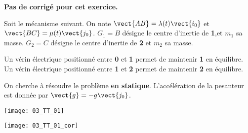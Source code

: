 \normaltrue
\correctiontrue



\setcounter{numques}{0}
\ifcorrection
\else
\textbf{Pas de corrigé pour cet exercice.}
\fi

\ifprof
\else
Soit le mécanisme suivant. On note $\vect{AB}=\lambda(t)\vect{i_0}$ et $\vect{BC}=\mu(t)\vect{j_0}$.
$G_1 = B$ désigne le centre d'inertie de \textbf{1},et $m_1$ sa masse. %
$G_2 = C$ désigne le centre d'inertie de \textbf{2} et  $m_2$ sa masse. %

 Un vérin électrique positionné entre \textbf{0} et \textbf{1} permet de maintenir \textbf{1} en équilibre.
 Un vérin électrique positionné entre \textbf{1} et \textbf{2} permet de maintenir \textbf{2} en équilibre.
 
 On cherche à résoudre le problème \textbf{en statique}.
L'accélération de la pesanteur est donnée par $\vect{g}=-g\vect{j_0}$.



\begin{center}
\texttt{[image: 03\_TT\_01]}
\end{center}
\fi

\ifprof
\begin{center}
\texttt{[image: 03\_TT\_01\_cor]}
\end{center}

\else
\fi




\ifprof
\else
\fi

\ifprof
\else
\fi

